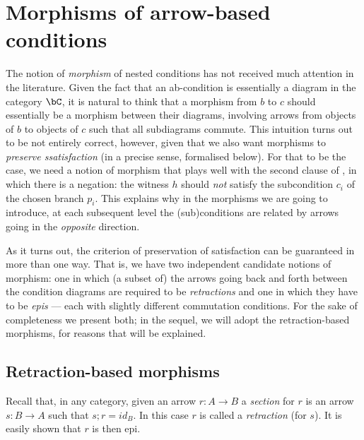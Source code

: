 \section{Morphisms of arrow-based conditions}

The notion of \emph{morphism} of nested conditions has not received much attention in the literature. Given the fact that an ab-condition is essentially a diagram in the category $\bC$, it is natural to think that a morphism from $b$ to $c$ should essentially be a morphism between their diagrams, involving arrows from objects of $b$ to objects of $c$ such that all subdiagrams commute. This intuition turns out to be not entirely correct, however, given that we also want morphisms to \emph{preserve ssatisfaction} (in a precise sense, formalised below). 
For that to be the case, we need a notion of morphism that plays well with the second clause of , in which there is a negation: the witness $h$ should \emph{not} satisfy the subcondition $c_i$ of the chosen branch $p_i$. This explains why in the morphisms we are going to introduce, at each subsequent level the (sub)conditions are related by arrows going in the \emph{opposite} direction.

As it turns out, the criterion of preservation of satisfaction can be guaranteed in more than one way. That is, we have two independent candidate notions of morphism: one in which (a subset of) the arrows going back and forth between the condition diagrams are required to be \emph{retractions} and one in which they have to be \emph{epis} --- each with slightly different commutation conditions. For the sake of completeness we present both; in the sequel, we will adopt the retraction-based morphisms, for reasons that will be explained.

\subsection{Retraction-based morphisms}

Recall that, in any category, given an arrow $r: A \to B$ a \emph{section} for $r$ is an arrow $s: B \to A$ such that $s;r = id_B$. In this case $r$ is called a \emph{retraction} (for $s$). It is easily shown that $r$ is then epi.

